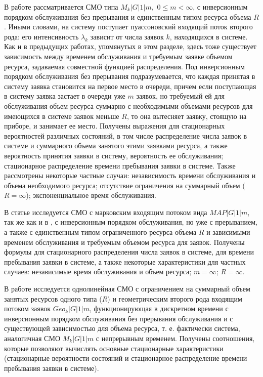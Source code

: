 \documentclass[a4paper,12pt]{article}
\begin{document}
В работе \cite{Pechinkin_30_1998} рассматривается СМО типа $M_k|G|1|m,$ $0\leq m <\infty$, с инверсионным порядком обслуживания без прерывания и единственным типом ресурса объема $R$. Иными словами, на систему поступает пуассоновский входящий поток второго рода: его интенсивность $\lambda_k$ зависит от числа заявок $k$, находящихся в системе. Как и в предыдущих работах, упомянутых в этом разделе, здесь тоже существует зависимость между временем обслуживания и требуемым заявке объемом ресурса, задаваемая совместной функцией распределения. Под инверсионным порядком обслуживания без прерывания подразумевается, что каждая принятая в систему заявка становится на первое место в очереди, причем если поступающая в систему заявка застает в очереди уже $m$ заявок, но требуемый ей для обслуживания объем ресурса суммарно с необходимыми объемами ресурсов для имеющихся в системе заявок меньше $R$, то она вытесняет заявку, стоящую на приборе, и занимает ее место. Получены выражения для стационарных вероятностей различных состояний, в том числе распределение числа заявок в системе и суммарного объема занятого этими заявками ресурса, а также вероятность принятия заявки в систему, вероятность ее обслуживания; стационарное распределение времени пребывания заявки в системе. Также рассмотрены некоторые частные случаи: независимость времени обслуживания и объема необходимого ресурса; отсутствие ограничения на суммарный объем ($R=\infty$); экспоненциальное время обслуживания.



В статье \cite{Pechinkin_31_1999} исследуется СМО с марковским входящим потоком вида $MAP|G|1|m$, так же как и в \cite{Pechinkin_30_1998}, с инверсионным порядком обслуживания, но уже с прерыванием, а также с единственным типом ограниченного ресурса объема $R$ и зависимыми временем обслуживания и требуемым объемом ресурса для заявок. Получены формулы для стационарного распределения числа заявок в системе, для времени пребывания заявки в системе, а также некоторые характеристики для частных случаев: независимые время обслуживания и объем ресурса; $m=\infty$; $R=\infty$.



В работе \cite{Pechinkin_28_2011} исследуется однолинейная СМО с ограничением на суммарный объем занятых ресурсов одного типа ($R$) и геометрическим второго рода входящим потоком заявок $Geo_k|G|1|m$, функционирующая в дискретном времени с инверсионным порядком обслуживания без прерывания обслуживания и с существующей зависимостью для объема ресурса, т. е. фактически система, аналогичная СМО $M_k|G|1|m$ с непрерывным временем. Получены соотношения, которые позволяют вычислять основные стационарные характеристики (стационарные вероятности состояний и стационарное распределение времени пребывания заявки в системе).
\end{document}
